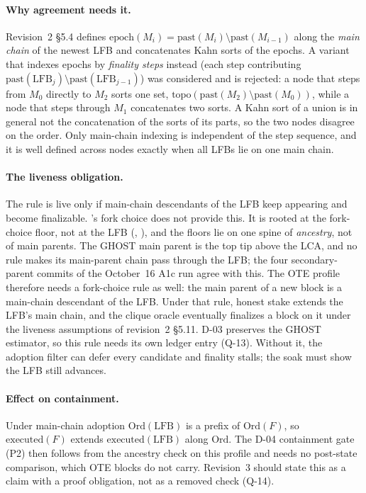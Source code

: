 \documentclass[11pt]{article}
\newcommand{\code}{\path}
\begin{document}
\paragraph{Why agreement needs it.} Revision~2 \S5.4 defines $\mathrm{epoch}(M_i) = \mathrm{past}(M_i) \setminus \mathrm{past}(M_{i-1})$ along the \emph{main chain} of the newest LFB and concatenates Kahn sorts of the epochs. A variant that indexes epochs by \emph{finality steps} instead (each step contributing $\mathrm{past}(\mathrm{LFB}_{j}) \setminus \mathrm{past}(\mathrm{LFB}_{j-1})$) was considered and is rejected: a node that steps from $M_0$ directly to $M_2$ sorts one set, $\mathrm{topo}(\mathrm{past}(M_2) \setminus \mathrm{past}(M_0))$, while a node that steps through $M_1$ concatenates two sorts. A Kahn sort of a union is in general not the concatenation of the sorts of its parts, so the two nodes disagree on the order. Only main-chain indexing is independent of the step sequence, and it is well defined across nodes exactly when all LFBs lie on one main chain.

\paragraph{The liveness obligation.} The rule is live only if main-chain descendants of the LFB keep appearing and become finalizable. \code{dev}'s fork choice does not provide this. It is rooted at the fork-choice floor, not at the LFB (, ), and the floors lie on one spine of \emph{ancestry}, not of main parents. The GHOST main parent is the top tip above the LCA, and no rule makes its main-parent chain pass through the LFB; the four secondary-parent commits of the October~16 A1c run agree with this. The OTE profile therefore needs a fork-choice rule as well: the main parent of a new block is a main-chain descendant of the LFB. Under that rule, honest stake extends the LFB's main chain, and the clique oracle eventually finalizes a block on it under the liveness assumptions of revision~2 \S5.11. D-03 preserves the \code{dev} GHOST estimator, so this rule needs its own ledger entry (Q-13). Without it, the adoption filter can defer every candidate and finality stalls; the soak must show the LFB still advances.

\paragraph{Effect on containment.} Under main-chain adoption $\mathrm{Ord}(\mathrm{LFB})$ is a prefix of $\mathrm{Ord}(F)$, so $\mathrm{executed}(F)$ extends $\mathrm{executed}(\mathrm{LFB})$ along $\mathrm{Ord}$. The D-04 containment gate (P2) then follows from the ancestry check on this profile and needs no post-state comparison, which OTE blocks do not carry. Revision~3 should state this as a claim with a proof obligation, not as a removed check (Q-14).
\end{document}
